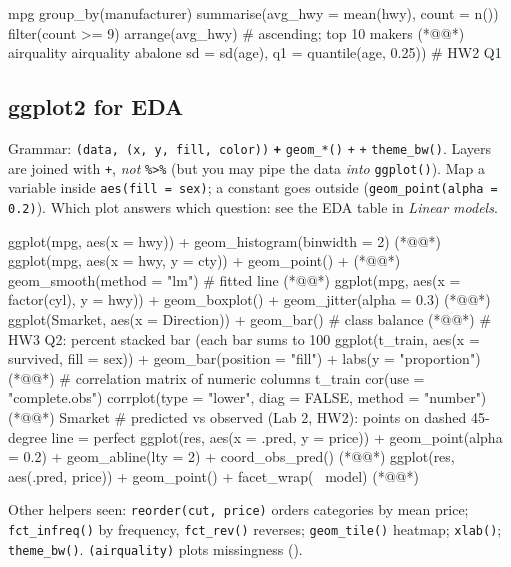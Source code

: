 \begin{rcode}
mpg %
  group_by(manufacturer) %
  summarise(avg_hwy = mean(hwy), count = n()) %
  filter(count >= 9) %
  arrange(avg_hwy)          # ascending; top 10 makers (*@@*)
airquality %
airquality %
abalone %
  sd = sd(age), q1 = quantile(age, 0.25))   # HW2 Q1
\end{rcode}

\subsection{ggplot2 for EDA}
Grammar: \texttt{(data, }\texttt{(x, y, fill, color))} \textbf{\texttt{+}} \texttt{geom\_*()} \texttt{+}  \texttt{+} \texttt{theme\_bw()}.
Layers are joined with \texttt{+}, \emph{not} \texttt{\%>\%} (but you may pipe the data \emph{into} \texttt{ggplot()}).
Map a variable inside \texttt{aes(fill = sex)}; a constant goes outside (\texttt{geom\_point(alpha = 0.2)}).
Which plot answers which question: see the EDA table in \emph{Linear models}.
\begin{rcode}
ggplot(mpg, aes(x = hwy)) + geom_histogram(binwidth = 2) (*@@*)
ggplot(mpg, aes(x = hwy, y = cty)) + geom_point() +  (*@@*)
  geom_smooth(method = "lm")        # fitted line  (*@@*)
ggplot(mpg, aes(x = factor(cyl), y = hwy)) +
  geom_boxplot() + geom_jitter(alpha = 0.3)  (*@@*)
ggplot(Smarket, aes(x = Direction)) + geom_bar() # class balance (*@@*)
# HW3 Q2: percent stacked bar (each bar sums to 100%
ggplot(t_train, aes(x = survived, fill = sex)) +
  geom_bar(position = "fill") + labs(y = "proportion") (*@@*)
# correlation matrix of numeric columns
t_train %
  cor(use = "complete.obs") %
  corrplot(type = "lower", diag = FALSE, method = "number") (*@@*)
Smarket %
# predicted vs observed (Lab 2, HW2): points on dashed 45-degree line = perfect
ggplot(res, aes(x = .pred, y = price)) + geom_point(alpha = 0.2) +
  geom_abline(lty = 2) + coord_obs_pred()  (*@@*)
ggplot(res, aes(.pred, price)) + geom_point() + facet_wrap(~ model) (*@@*)
\end{rcode}
Other helpers seen: \texttt{reorder(cut, price)} orders categories by mean price; \texttt{fct\_infreq()} by frequency,
\texttt{fct\_rev()} reverses; \texttt{geom\_tile()} heatmap; \texttt{xlab()}; \texttt{theme\_bw()}.
\texttt{(airquality)} plots missingness ().

